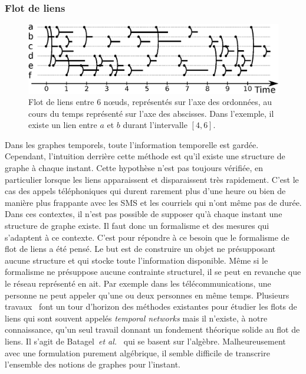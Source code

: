 \subsubsection{Flot de liens}
\begin{figure}[h]
\centering
\includegraphics[width=0.9\linewidth]{img/Intro/Flot_de_liens.eps}
\caption{Flot de liens entre $6$ n\oe{}uds, représentés sur l'axe des ordonnées, au cours du temps représenté sur l'axe des abscisses.
Dans l'exemple, il existe un lien entre $a$ et $b$ durant l'intervalle $[4,6]$.
}
\label{fig:exemple_Flot_de_liens}
\end{figure}
Dans les graphes temporels, toute l'information temporelle est gardée.
Cependant, l'intuition derrière cette méthode est qu'il existe une structure de graphe à chaque instant.
Cette hypothèse n'est pas toujours vérifiée, en particulier lorsque les liens apparaissent et disparaissent très rapidement.
C'est le cas des appels téléphoniques qui durent rarement plus d'une heure ou bien de manière plus frappante avec les SMS et les courriels qui n'ont même pas de durée.
Dans ces contextes, il n'est pas possible de supposer qu'à chaque instant une structure de graphe existe.
Il faut donc un formalisme et des mesures qui s'adaptent à ce contexte.
C'est pour répondre à ce besoin que le formalisme de flot de liens a été pensé.
Le but est de construire un objet ne présupposant aucune structure et qui stocke toute l'information disponible.
Même si le formalisme ne présuppose aucune contrainte structurel, il se peut en revanche que le réseau représenté en ait.
Par exemple dans les télécommunications, une personne ne peut appeler qu'une ou deux personnes en même temps.
Plusieurs travaux~\cite{Holme2013a,Holme2015b,Holme2015e} font un tour d'horizon des méthodes existantes pour étudier les flots de liens qui sont souvent appelés \emph{temporal networks} mais il n'existe, à notre connaissance, qu'un seul travail donnant un fondement théorique solide au flot de liens.
Il s'agit de Batagel~\emph{et al.}~\cite{Batagelj2016} qui se basent sur l'algèbre.
Malheureusement avec une formulation purement algébrique, il semble difficile de transcrire l'ensemble des notions de graphes pour l'instant.
\bigskip

